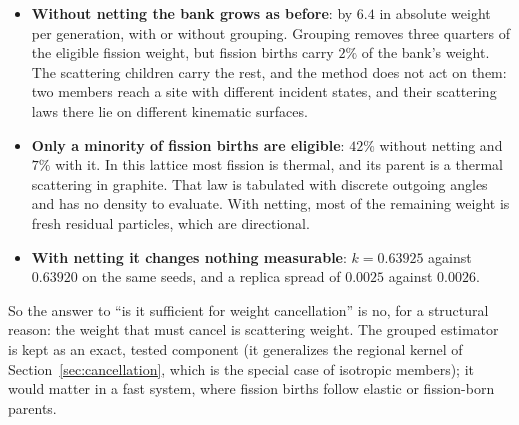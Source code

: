\begin{itemize}
\item \textbf{Without netting the bank grows as before}: by $6.4$ in absolute weight per generation,
  with or without grouping. Grouping removes three quarters of the eligible fission weight, but
  fission births carry $2\%$ of the bank's weight. The scattering children carry the rest, and the
  method does not act on them: two members reach a site with different incident states, and their
  scattering laws there lie on different kinematic surfaces.
\item \textbf{Only a minority of fission births are eligible}: $42\%$ without netting and $7\%$
  with it. In this lattice most fission is thermal, and its parent is a thermal scattering in
  graphite. That law is tabulated with discrete outgoing angles and has no density to evaluate.
  With netting, most of the remaining weight is fresh residual particles, which are directional.
\item \textbf{With netting it changes nothing measurable}: $k=0.63925$ against $0.63920$ on the
  same seeds, and a replica spread of $0.0025$ against $0.0026$.
\end{itemize}
So the answer to ``is it sufficient for weight cancellation'' is no, for a structural reason: the
weight that must cancel is scattering weight. The grouped estimator is kept as an exact, tested
component (it generalizes the regional kernel of Section~\ref{sec:cancellation}, which is the
special case of isotropic members); it would matter in a fast system, where fission births follow
elastic or fission-born parents.

